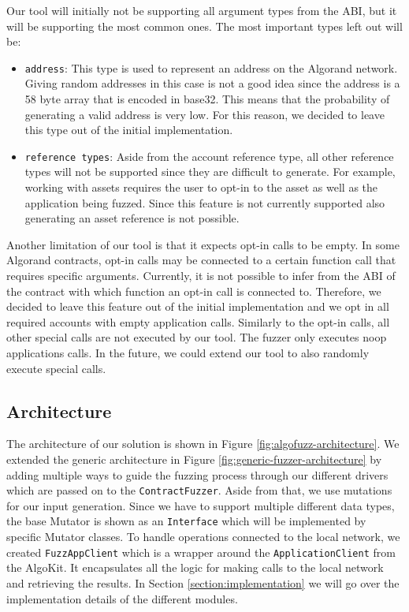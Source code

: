 Our tool will initially not be supporting all argument types from the \ac{ABI}, but it will be supporting the most common ones.
The most important types left out will be:
\begin{itemize}
    \item \texttt{address}: This type is used to represent an address on the Algorand network.
          Giving random addresses in this case is not a good idea since the address is a 58 byte array that is encoded in base32.
          This means that the probability of generating a valid address is very low. For this reason, we decided to leave this type out of the initial implementation.
    \item \texttt{reference types}: Aside from the account reference type, all other reference types will not be supported since they are difficult to generate.
          For example, working with assets requires the user to opt-in to the asset as well as the application being fuzzed.
          Since this feature is not currently supported also generating an asset reference is not possible.
\end{itemize}

Another limitation of our tool is that it expects opt-in calls to be empty.
In some Algorand contracts, opt-in calls may be connected to a certain function call that requires specific arguments.
Currently, it is not possible to infer from the \ac{ABI} of the contract with which function an opt-in call is connected to.
Therefore, we decided to leave this feature out of the initial implementation and we opt in all required accounts with empty application calls.
Similarly to the opt-in calls, all other special calls are not executed by our tool.
The fuzzer only executes noop applications calls.
In the future, we could extend our tool to also randomly execute special calls.

\subsection*{Architecture}
The architecture of our solution is shown in Figure \ref{fig:algofuzz-architecture}.
We extended the generic architecture in Figure \ref{fig:generic-fuzzer-architecture} by adding multiple ways to guide the fuzzing process through our different drivers which are passed on to the \texttt{ContractFuzzer}.
Aside from that, we use mutations for our input generation. Since we have to support multiple different data types, the base Mutator is shown as an \texttt{Interface} which will be implemented by specific Mutator classes.
To handle operations connected to the local network, we created \texttt{FuzzAppClient} which is a wrapper around the \texttt{ApplicationClient} from the AlgoKit.
It encapsulates all the logic for making calls to the local network and retrieving the results.
In Section \ref{section:implementation} we will go over the implementation details of the different modules.

